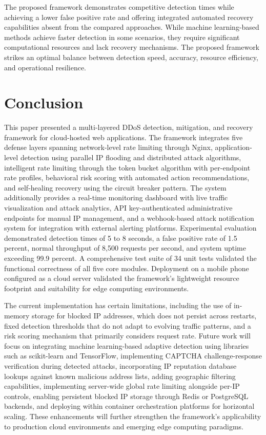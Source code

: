 \documentclass[conference]{IEEEtran}
\begin{document}
The proposed framework demonstrates competitive detection times while achieving a lower false positive rate and offering integrated automated recovery capabilities absent from the compared approaches. While machine learning-based methods achieve faster detection in some scenarios, they require significant computational resources and lack recovery mechanisms. The proposed framework strikes an optimal balance between detection speed, accuracy, resource efficiency, and operational resilience.

\section{Conclusion}

This paper presented a multi-layered DDoS detection, mitigation, and recovery framework for cloud-hosted web applications. The framework integrates five defense layers spanning network-level rate limiting through Nginx, application-level detection using parallel IP flooding and distributed attack algorithms, intelligent rate limiting through the token bucket algorithm with per-endpoint rate profiles, behavioral risk scoring with automated action recommendations, and self-healing recovery using the circuit breaker pattern. The system additionally provides a real-time monitoring dashboard with live traffic visualization and attack analytics, API key-authenticated administrative endpoints for manual IP management, and a webhook-based attack notification system for integration with external alerting platforms. Experimental evaluation demonstrated detection times of 5 to 8 seconds, a false positive rate of 1.5 percent, normal throughput of 8,500 requests per second, and system uptime exceeding 99.9 percent. A comprehensive test suite of 34 unit tests validated the functional correctness of all five core modules. Deployment on a mobile phone configured as a cloud server validated the framework's lightweight resource footprint and suitability for edge computing environments.

The current implementation has certain limitations, including the use of in-memory storage for blocked IP addresses, which does not persist across restarts, fixed detection thresholds that do not adapt to evolving traffic patterns, and a risk scoring mechanism that primarily considers request rate. Future work will focus on integrating machine learning-based adaptive detection using libraries such as scikit-learn and TensorFlow, implementing CAPTCHA challenge-response verification during detected attacks, incorporating IP reputation database lookups against known malicious address lists, adding geographic filtering capabilities, implementing server-wide global rate limiting alongside per-IP controls, enabling persistent blocked IP storage through Redis or PostgreSQL backends, and deploying within container orchestration platforms \cite{b22} for horizontal scaling. These enhancements will further strengthen the framework's applicability to production cloud environments and emerging edge computing paradigms.
\end{document}
